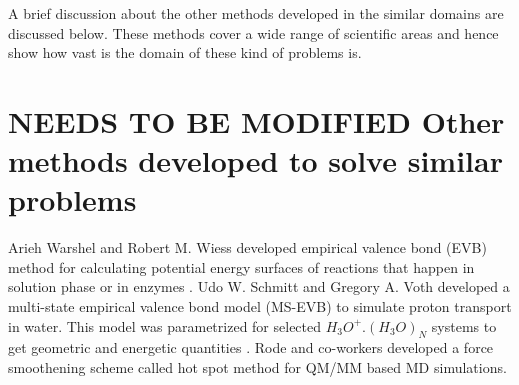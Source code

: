 A brief discussion about the other methods developed in the similar domains are discussed
below. These methods cover a wide range of scientific areas and hence show how vast is
the domain of these kind of problems is.

\section{NEEDS TO BE MODIFIED Other methods developed to solve similar problems}
Arieh Warshel and Robert M. Wiess developed empirical valence bond (EVB) method
for calculating potential energy surfaces of reactions that happen in solution phase or
in enzymes \cite{jacs102.6218}.
Udo W. Schmitt and Gregory A. Voth developed a multi-state empirical valence bond
model (MS-EVB) \cite{schmitt1998multistate} to simulate proton transport in water. This
model was parametrized for selected $H_3O^+.(H_3O)_N$ systems to get geometric and
energetic quantities \cite{luz1964activation}.
Rode and co-workers developed \cite{kerdcharoen1996qm, hofer2005structure,
schwenk2003structure} a force smoothening scheme called hot spot method for QM/MM based
MD simulations.
